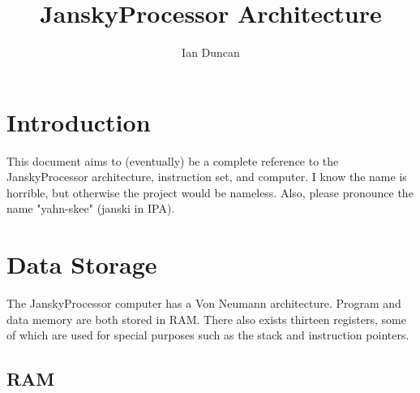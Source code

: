 \documentclass[12pt,letterpaper]{article}
\author{Ian Duncan}
\title{JanskyProcessor Architecture}
\begin{document}
\maketitle
\newpage
\tableofcontents
\section*{Introduction}
This document aims to (eventually) be a complete reference to the JanskyProcessor architecture, instruction set, and computer. I know the name is horrible, but otherwise the project would be nameless. Also, please pronounce the name "yahn-skee" (janski in IPA).
\section{Data Storage}
The JanskyProcessor computer has a Von Neumann architecture. Program and data memory are both stored in RAM. There also exists thirteen registers, some of which are used for special purposes such as the stack and instruction pointers.

\subsection{RAM}
\end{document}
